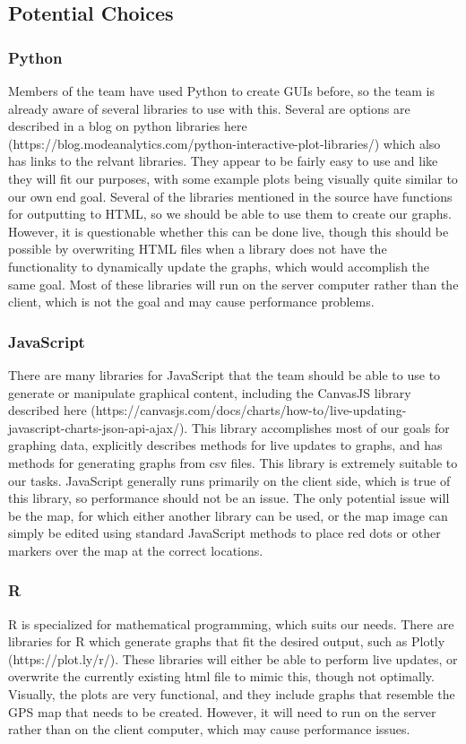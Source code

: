 \documentclass[onecolumn, draftclsnofoot,10pt, compsoc]{IEEEtran}
\begin{document}
\subsection{Potential Choices}
\subsubsection{Python}
Members of the team have used Python to create GUIs before, so the team is already aware of several libraries to use with this. Several are options are described in a blog on python libraries here (https://blog.modeanalytics.com/python-interactive-plot-libraries/) which also has links to the relvant libraries. They appear to be fairly easy to use and like they will fit our purposes, with some example plots being visually quite similar to our own end goal. Several of the libraries mentioned in the source have functions for outputting to HTML, so we should be able to use them to create our graphs. However, it is questionable whether this can be done live, though this should be possible by overwriting HTML files when a library does not have the functionality to dynamically update the graphs, which would accomplish the same goal. Most of these libraries will run on the server computer rather than the client, which is not the goal and may cause performance problems.

\subsubsection{JavaScript}
There are many libraries for JavaScript that the team should be able to use to generate or manipulate graphical content, including the CanvasJS library described here (https://canvasjs.com/docs/charts/how-to/live-updating-javascript-charts-json-api-ajax/). This library accomplishes most of our goals for graphing data, explicitly describes methods for live updates to graphs, and has methods for generating graphs from csv files. This library is extremely suitable to our tasks. JavaScript generally runs primarily on the client side, which is true of this library, so performance should not be an issue. The only potential issue will be the map, for which either another library can be used, or the map image can simply be edited using standard JavaScript methods to place red dots or other markers over the map at the correct locations.

\subsubsection{R}
R is specialized for mathematical programming, which suits our needs. There are libraries for R which generate graphs that fit the desired output, such as Plotly (https://plot.ly/r/). These libraries will either be able to perform live updates, or overwrite the currently existing html file to mimic this, though not optimally. Visually, the plots are very functional, and they include graphs that resemble the GPS map that needs to be created. However, it will need to run on the server rather than on the client computer, which may cause performance issues.
\end{document}
